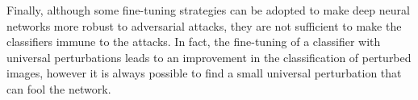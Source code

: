 Finally, although some fine-tuning strategies can be adopted to make deep neural networks more robust to adversarial
attacks, they are not sufficient to make the classifiers immune to the attacks. In fact, the fine-tuning of a classifier
with universal perturbations leads to an improvement in the classification of perturbed images, however it is always
possible to find a small universal perturbation that can fool the network.




